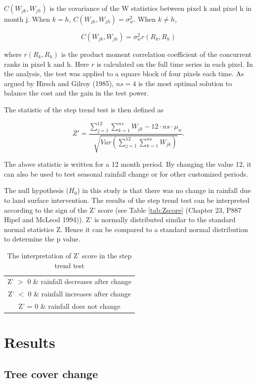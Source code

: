 \documentclass[]{elsarticle} %
\theoremstyle{definition}
\theoremstyle{definition}
\theoremstyle{definition}
\theoremstyle{remark}
\begin{document}
\(C(W_{jk},W_{jh})\) is the covariance of the W statistics between pixel
k and pixel h in month j. When \(k=h\), \(C(W_{jk},W_{jh})=\sigma^2_w\).
When \(k\neq h\),

\begin{equation}
  C(W_{jk},W_{jh})=\sigma^2_w r(R_k,R_h)
\end{equation}

where \(r(R_k,R_h)\) is the product moment correlation coefficient of
the concurrent ranks in pixel k and h. Here \(r\) is calculated on the
full time series in each pixel. In the analysis, the test was applied to
a square block of four pixels each time. As argued by Hirsch and Gilroy
(1985), \(ns=4\) is the most optimal solution to balance the cost and
the gain in the test power.

The statistic of the step trend test is then defined as

\begin{equation}
  Z'=\frac{\sum_{j=1}^{12}\sum_{k=1}^{ns}W_{jk}-12\cdot ns\cdot\mu_w}{\sqrt{Var(\sum_{j=1}^{12}\sum_{k=1}^{ns}W_{jk})}}.
  \label{eq:Z}
\end{equation}

The above statistic is written for a 12 month period. By changing the
value 12, it can also be used to test seasonal rainfall change or for
other customized periods.

The null hypothesis (\(H_0\)) in this study is that there was no change
in rainfall due to land surface intervention. The results of the step
trend test can be interpreted according to the sign of the Z' score (see
Table \ref{tab:Zscore} (Chapter 23, P887 Hipel and McLeod 1994)). Z' is
normally distributed similar to the standard normal statistics Z. Hence
it can be compared to a standard normal distribution to determine the p
value.

\begin{longtable}[]{@{}c@{}}
\caption{The interpretation of Z' score in the step trend
test}\tabularnewline
\toprule
Z' \(>\) 0 \& rainfall decreases after change\tabularnewline
Z' \(<\) 0 \& rainfall increases after change\tabularnewline
Z' = 0 \& rainfall does not change\tabularnewline
\bottomrule
\end{longtable}

\section{Results}\label{results}

\subsection{Tree cover change}\label{tree-cover-change}
\end{document}
